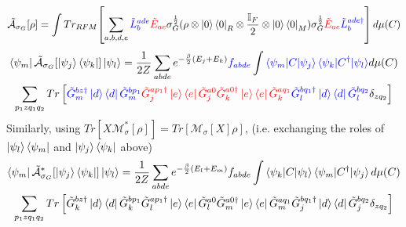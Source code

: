    \begin{equation}
    \tilde{\mathcal{A}}_{\sigma_G}[\rho] = \int Tr_{RFM}\!\left[\sum_{a,b,d,e}\textcolor{blue}{\tilde L^{ade}_b} \textcolor{red}{\tilde E_{ae}} \sigma_G^{\frac{1}{2}} (\rho\otimes \ket{0}\bra{0}_R \otimes \frac{\mathbb{I}_F}{2}\otimes \ket{0}\bra{0}_M) \sigma_G^{\frac{1}{2}}\textcolor{red}{\tilde E_{ae}}\textcolor{blue}{\tilde L^{ade\dagger}_b}\right] d\mu(C)
\end{equation}
\begin{multline}
    \bra{\psi_m}\tilde{\mathcal{A}}_{\sigma_G}[\ket{\psi_j}\bra{\psi_k}]\ket{\psi_l}=\frac{1}{2Z} \sum_{abde} e^{-\frac{\beta}{2}(E_j+E_k)}\textcolor{blue}{f_{abde}} \int \textcolor{blue}{\braket{\psi_m|C|\psi_j}\braket{\psi_k|C^{\dagger}|\psi_l}} d\mu(C)\\\sum_{p_1zq_1 q_2}Tr\left[\textcolor{blue}{\tilde G^{bz\dagger}_m\ket{d}\bra{d}\tilde G^{bp_1}_m} \textcolor{red}{\tilde G_j^{ap_1\dagger}\ket{e}\bra{e}\tilde G_j^{a0}\tilde G_k^{a0\dagger}\ket{e}\bra{e}\tilde G_k^{aq_1}} \textcolor{blue}{\tilde G^{bq_1\dagger}_l\ket{d}\bra{d}\tilde G^{bq_2}_l} \delta_{zq_2}\right]
    \label{eq:Arho}
\end{multline}
Similarly, using $Tr[X\mathcal{M}^*_{\sigma}[\rho]] = Tr[\mathcal{M}_{\sigma}[X]\rho]$, (i.e. exchanging the roles of $\ket{\psi_l}\bra{\psi_m}$ and $\ket{\psi_j}\bra{\psi_k}$ above)
\begin{multline}
   \bra{\psi_m}\tilde{\mathcal{A}}^*_{\sigma_G}[\ket{\psi_j}\bra{\psi_k}]\ket{\psi_l} =\frac{1}{2Z} \sum_{abde} e^{-\frac{\beta}{2}(E_l+E_m)}f_{abde} \int \braket{\psi_k|C|\psi_l}\braket{\psi_m|C^{\dagger}|\psi_j} d\mu(C)\\\sum_{p_1z q_1 q_2} Tr\left[\tilde G^{bz\dagger}_k\ket{d}\bra{d}\tilde G^{bp_1}_k\tilde G_l^{ap_1\dagger}\ket{e}\bra{e}\tilde G_l^{a0}\tilde G_m^{a0\dagger}\ket{e}\bra{e}\tilde G_m^{aq_1}\tilde G^{bq_1\dagger}_j\ket{d}\bra{d}\tilde G^{bq_2}_j  \delta_{zq_2}\right]
    \label{eq:A*rho}
\end{multline}
